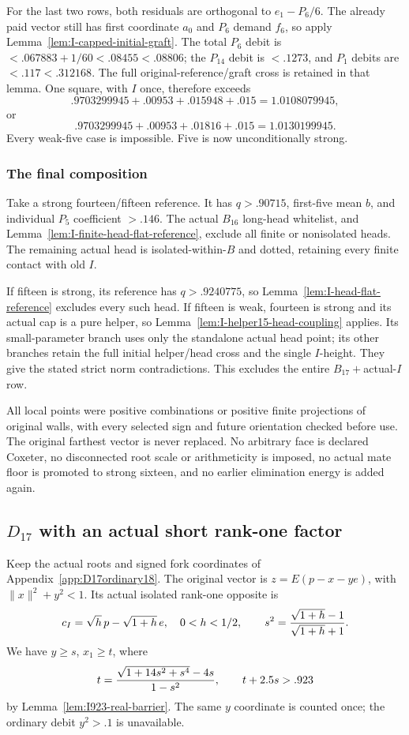 \documentclass[11pt]{article}
\theoremstyle{definition}
\theoremstyle{remark}
\newcommand{\norm}[1]{\lVert #1\rVert}
\begin{document}
For the last two rows, both residuals are orthogonal to
\(e_1-P_6/6\). The already paid vector still has first coordinate
\(a_0\) and \(P_6\) demand \(f_6\), so apply
Lemma~\ref{lem:I-capped-initial-graft}.
The total \(P_6\) debit is
\(<.067883+1/60<.08455<.08806\); the \(P_{14}\) debit
is \(<.1273\), and \(P_1\) debits are \(<.117<.312168\).
The full original-reference/graft cross is retained in that lemma.
One square, with \(I\) once, therefore exceeds
\[
 .9703299945+.00953+.015948+.015=1.0108079945,
\]
or
\[
 .9703299945+.00953+.01816+.015=1.0130199945.
\]
Every weak-five case is impossible. Five is now unconditionally strong.

\subsubsection{The final composition}
Take a strong fourteen/fifteen reference. It has \(q>.90715\),
first-five mean \(b\), and individual \(P_5\) coefficient \(>.146\).
The actual \(B_{16}\) long-head whitelist, and
Lemma~\ref{lem:I-finite-head-flat-reference}, exclude all finite
or nonisolated heads. The remaining actual head is isolated-within-\(B\)
and dotted, retaining every finite contact with old \(I\).

If fifteen is strong, its reference has \(q>.9240775\), so
Lemma~\ref{lem:I-head-flat-reference} excludes every such head.
If fifteen is weak, fourteen is strong and its actual cap is a pure
helper, so Lemma~\ref{lem:I-helper15-head-coupling} applies.
Its small-parameter branch uses only the standalone actual head point;
its other branches retain the full initial helper/head cross and
the single \(I\)-height. They give the stated strict norm contradictions.
This excludes the entire \(B_{17}+\)actual-\(I\) row.

All local points were positive combinations or positive finite
projections of original walls, with every selected sign and future
orientation checked before use. The original farthest vector is never
replaced. No arbitrary face is declared Coxeter, no disconnected root
scale or arithmeticity is imposed, no actual mate floor is promoted to
strong sixteen, and no earlier elimination energy is added again.

\subsection{\(D_{17}\) with an actual short rank-one factor}
\label{app:D17I18}
Keep the actual roots and signed fork coordinates of
Appendix~\ref{app:D17ordinary18}. The original vector is
\(z=E(p-x-ye)\), with \(\norm x^2+y^2<1\). Its actual isolated
rank-one opposite is
\[
 c_I=\sqrt h\,p-\sqrt{1+h}\,e,\quad0<h<1/2,\qquad
 s^2={\sqrt{1+h}-1\over\sqrt{1+h}+1}.
\]
We have \(y\ge s\), \(x_1\ge t\), where
\[
 t={\sqrt{1+14s^2+s^4}-4s\over1-s^2},\qquad t+2.5s>.923
\]
by Lemma~\ref{lem:I923-real-barrier}. The same \(y\) coordinate
is counted once; the ordinary debit \(y^2>.1\) is unavailable.
\end{document}
